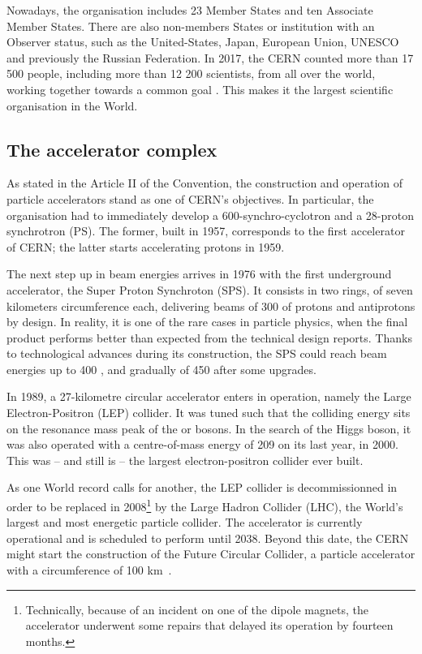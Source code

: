 Nowadays, the organisation includes 23 Member States and ten Associate Member States. There are also non-members States or institution with an Observer status, such as the United-States, Japan, European Union, UNESCO and previously the Russian Federation. In 2017, the CERN counted more than 17 500 people, including more than 12 200 scientists, from all over the world, working together towards a common goal \cite{cernOurPeople2023}. This makes it the largest scientific organisation in the World.

\subsection{The accelerator complex}
\label{subsec:AcceleratorComplex}

As stated in the Article II of the Convention, the construction and operation of particle accelerators stand as one of CERN's objectives. In particular, the organisation had to immediately develop a 600-\mev synchro-cyclotron and a 28-\gev proton synchrotron (PS). The former, built in 1957, corresponds to the first accelerator of CERN; the latter starts accelerating protons in 1959.

The next step up in beam energies arrives in 1976 with the first underground accelerator, the Super Proton Synchroton (SPS). It consists in two rings, of seven kilometers circumference each, delivering beams of 300 \gev of protons and antiprotons by design. In reality, it is one of the rare cases in particle physics, when the final product performs better than expected from the technical design reports. Thanks to technological advances during its construction, the SPS could reach beam energies up to 400 \gev, and gradually of 450 \gev after some upgrades.

In 1989, a 27-kilometre circular accelerator enters in operation, namely the Large Electron-Positron (LEP) collider. It was tuned such that the colliding energy sits on the resonance mass peak of the \rmZzero or \rmWplusminus bosons. In the search of the Higgs boson, it was also operated with a centre-of-mass energy of 209 \gev on its last year, in 2000. This was -- and still is -- the largest electron-positron collider ever built.

As one World record calls for another, the LEP collider is decommissionned in order to be replaced in 2008\footnote{Technically, because of an incident on one of the dipole magnets, the accelerator underwent some repairs that delayed its operation by fourteen months.} by the Large Hadron Collider (LHC), the World's largest and most energetic particle collider. The accelerator is currently operational and is scheduled to perform until 2038. Beyond this date, the CERN might start the construction of the Future Circular Collider, a particle accelerator with a circumference of 100 km~\cite{cernFutureCircularCollider2023}\cite{benediktFutureCircularCollider2019}.\\


